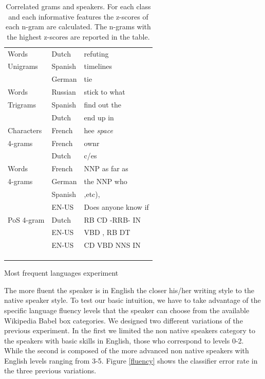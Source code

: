 \documentclass[10pt,a5paper,twoside]{article}
\begin{document}
\begin{table}[t]
\begin{subtable}[]{0.5\textwidth}
\begin{tabular}{l|ll}
   Words &Dutch& refuting\\
      Unigrams&Spanish&timelines\\
       &German& tie\\\hline

   Words&Russian& stick to what\\
   Trigrams&Spanish& find out the\\
   &Dutch& end up in\\\hline

   Characters &French& hee \emph{space}\\
   4-grams      &French&ownr\\
&Dutch&c/es\\
   \hline
   Words &French& NNP as far as\\
   4-grams &German& the NNP who\\
   &Spanish& ,etc),\\
   &EN-US& Does anyone know if\\\hline
   PoS 4-gram &Dutch& RB CD -RRB- IN \\
   &EN-US& VBD , RB DT\\
   &EN-US& CD VBD NNS IN\\
   && \\
   && \\
   && \\
   \end{tabular}
   \label{table:frequent}
   \caption{Most frequent languages experiment}
   \end{subtable}
\caption{Correlated grams and speakers. For each class and each informative
features the z-scores of each n-gram are calculated. The n-grams with the
highest z-scores are reported in the table.}
\end{table}

The more fluent the speaker is in English the closer his/her writing
style to the native speaker style. To test our basic intuition,
we have to take advantage of the specific language fluency levels that the speaker can choose
from the available Wikipedia Babel box categories. We designed two different
variations of the previous experiment. In the first we limited
the non native speakers category to the speakers with basic skills in English,
those who correspond to levels 0-2.
While the second is composed of the more advanced non native speakers with
English levels ranging from 3-5.
Figure \ref{fluency} shows the classifier error rate in the three previous
variations.
\end{document}
